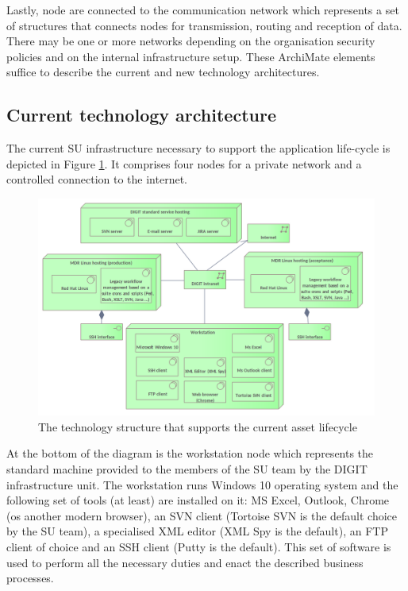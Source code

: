 	Lastly, node are connected to the communication network which represents a set of structures that connects nodes for transmission, routing and reception of data. There may be one or more networks depending on the organisation security policies and on the internal infrastructure setup. These ArchiMate elements suffice to describe the current and new technology architectures. 	
	
	\subsection{Current technology architecture}
	\label{sec:technology-current}
	
	The current SU infrastructure necessary to support the application life-cycle is depicted in Figure \ref{fig:technology-current}. It comprises four nodes for a private network and a controlled connection to the internet. 
	
	\begin{figure}[!h]
		\centering
		\includegraphics[width=1.01\textwidth]{images/technology/Current Platform.png}
		\caption{The technology structure that supports the current asset lifecycle}
		\label{fig:technology-current}
	\end{figure}
	
	At the bottom of the diagram is the workstation node which represents the standard machine provided to the members of the SU team by the DIGIT infrastructure unit. The workstation runs Windows 10 \citep{windows10} operating system and the following set of tools (at least) are installed on it: MS Excel, Outlook, Chrome (os another modern browser), an SVN client (Tortoise SVN is the default choice by the SU team), a specialised XML editor (XML Spy is the default), an FTP client of choice and an SSH client (Putty is the default). This set of software is used to perform all the necessary duties and enact the described business processes. 
	
